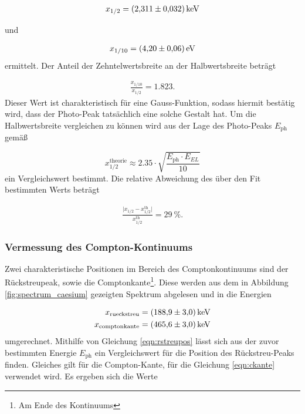 \begin{align*}
  x_{1/2} = \SI{2.311+-0.032}{\kilo\electronvolt}
\end{align*}

und

\begin{align*}
  x_{1/10} = \SI{4.2+-0.06}{\electronvolt}
\end{align*}
ermittelt.
Der Anteil der Zehntelwertsbreite an der Halbwertsbreite beträgt

\begin{align*}
  \frac{x_{1/10}}{x_{1/2}} = \SI{1.823}.
\end{align*}
Dieser Wert ist charakteristisch für eine Gauss-Funktion, sodass hiermit bestätig wird, dass der Photo-Peak tatsächlich
eine solche Gestalt hat.
Um die Halbwertsbreite vergleichen zu können wird aus der Lage des Photo-Peaks $E_{\text{ph}}$  gemäß

\begin{equation}
    \label{eqn:halbwerttheorie}
    x_{1/2}^{\text{theorie}} \approx 2.35 \cdot \sqrt{\frac{E_\text{ph} \cdot E_{EL}}{10}}
\end{equation}
ein Vergleichswert bestimmt. Die relative Abweichung des über den Fit bestimmten Werts beträgt

\begin{align}
  \frac{\lvert x_{1/2} - x_{1/2}^{\text{th}} \rvert}{x_{1/2}^{\text{th}}} = \SI{29}{\percent}.
\end{align}
\FloatBarrier
\subsubsection{Vermessung des Compton-Kontinuums}
\label{subsubsec:a22}
Zwei charakteristische Positionen im Bereich des Comptonkontinuums sind der Rückstreupeak, sowie die
Comptonkante\footnote{Am Ende des Kontinuums}. Diese werden aus dem in Abbildung \ref{fig:spectrum_caesium} gezeigten
Spektrum abgelesen und in die Energien

\begin{align*}
  x_\text{rueckstreu} &= \SI{188.9+-3.0}{\kilo\electronvolt}\\
  x_\text{comptonkante} &= \SI{465.6+-3.0}{\kilo\electronvolt}
\end{align*}
umgerechnet. Mithilfe von Gleichung \eqref{eqn:rstreupos} lässt sich aus der zuvor bestimmten Energie $E_\text{ph}$
ein Vergleichswert für die Position des Rückstreu-Peaks finden. Gleiches gilt für die Compton-Kante, für die Gleichung
\eqref{eqn:ckante} verwendet wird.
Es ergeben sich die Werte

